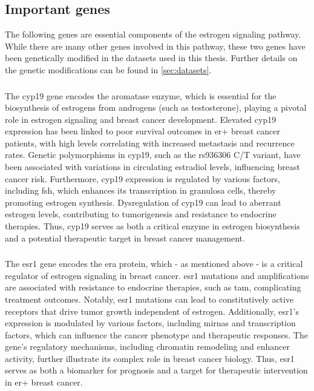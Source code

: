 \subsection{Important genes}
\label{sec:important_genes}

The following genes are essential components of the estrogen signaling pathway.
While there are many other genes involved in this pathway, these two genes have
been genetically modified in the datasets used in this thesis.
Further details on the genetic modifications can be found in
\cref{sec:datasets}.

\subsubsection{}
The \gls{cyp19} gene encodes the aromatase enzyme, which is essential for the
biosynthesis of estrogens from androgens (such as testosterone), playing a
pivotal role in estrogen signaling and breast cancer development.
Elevated \gls{cyp19} expression has been linked to poor survival outcomes in
\gls{er+} breast cancer patients, with high levels correlating with increased
metastasis and recurrence
rates\supercite{barros-oliveira_cyp19a1_2020,friesenhengst_elevated_2018}.
Genetic polymorphisms in \gls{cyp19}, such as the rs936306 C/T variant, have
been associated with variations in circulating estradiol levels, influencing
breast cancer risk\supercite{ghosh_potential_2012}.
Furthermore, \gls{cyp19} expression is regulated by various factors, including
\gls{fsh}, which enhances its transcription in granulosa cells, thereby
promoting estrogen
synthesis\supercite{savolainen-peltonen_estrogen_2018,li_microrna-7a2_2022}.
Dysregulation of \gls{cyp19} can lead to aberrant estrogen levels, contributing
to tumorigenesis and resistance to endocrine
therapies\supercite{dabydeen_comparison_2015}.
Thus, \gls{cyp19} serves as both a critical enzyme in estrogen biosynthesis and
a potential therapeutic target in breast cancer management.

\subsubsection{}
\label{sec:esr1}
The \gls{esr1} gene encodes the \gls{era} protein, which - as mentioned above -
is a critical regulator of estrogen signaling in breast cancer.
\Gls{esr1} mutations and amplifications are associated with resistance to
endocrine
therapies, such as \gls{tam}, complicating treatment
outcomes\supercite{aguilar_biological_2010,jeselsohn_emergence_2014}.
Notably, \gls{esr1} mutations can lead to constitutively active receptors that
drive tumor growth independent of estrogen\supercite{toy_activating_2017}.
Additionally, \gls{esr1}'s expression is modulated by various factors,
including \glspl{mirna} and transcription factors, which can influence the
cancer phenotype and therapeutic responses\supercite{mansoori_mir-142-3p_2019}.
The gene's regulatory mechanisms, including chromatin remodeling and enhancer
activity, further illustrate its complex role in breast cancer
biology\supercite{powers_proteasome_2013,tomita_cluster_2015}.
Thus, \gls{esr1} serves as both a biomarker for prognosis and a target for
therapeutic intervention in \gls{er+} breast cancer.

